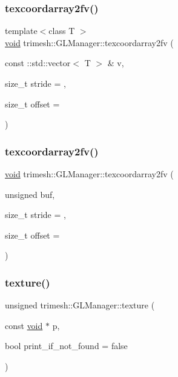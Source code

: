 \subsubsection{\texorpdfstring{texcoordarray2fv()}{texcoordarray2fv()}\hspace{0.1cm}{\footnotesize\ttfamily [2/3]}}
{\footnotesize\ttfamily template$<$class T $>$ \\
\hyperlink{namespacetrimesh_a784ddfd979e1c579bda795a8edfc3f43}{void} trimesh\+::\+G\+L\+Manager\+::texcoordarray2fv (\begin{DoxyParamCaption}\item[{const \+::std\+::vector$<$ T $>$ \&}]{v,  }\item[{size\+\_\+t}]{stride = {},  }\item[{size\+\_\+t}]{offset = {} }\end{DoxyParamCaption})\hspace{0.3cm}{\ttfamily [inline]}}

\mbox{\label{classtrimesh_1_1GLManager_af1bc046336d0353003cd37495ad0cccd}} 
\subsubsection{\texorpdfstring{texcoordarray2fv()}{texcoordarray2fv()}\hspace{0.1cm}{\footnotesize\ttfamily [3/3]}}
{\footnotesize\ttfamily \hyperlink{namespacetrimesh_a784ddfd979e1c579bda795a8edfc3f43}{void} trimesh\+::\+G\+L\+Manager\+::texcoordarray2fv (\begin{DoxyParamCaption}\item[{unsigned}]{buf,  }\item[{size\+\_\+t}]{stride = {},  }\item[{size\+\_\+t}]{offset = {} }\end{DoxyParamCaption})}

\mbox{\label{classtrimesh_1_1GLManager_a77d5b5ec42d43f6cdc47edda3be7c914}} 
\subsubsection{\texorpdfstring{texture()}{texture()}\hspace{0.1cm}{\footnotesize\ttfamily [1/2]}}
{\footnotesize\ttfamily unsigned trimesh\+::\+G\+L\+Manager\+::texture (\begin{DoxyParamCaption}\item[{const \hyperlink{namespacetrimesh_a784ddfd979e1c579bda795a8edfc3f43}{void} $\ast$}]{p,  }\item[{bool}]{print\+\_\+if\+\_\+not\+\_\+found = {\ttfamily false} }\end{DoxyParamCaption})}




